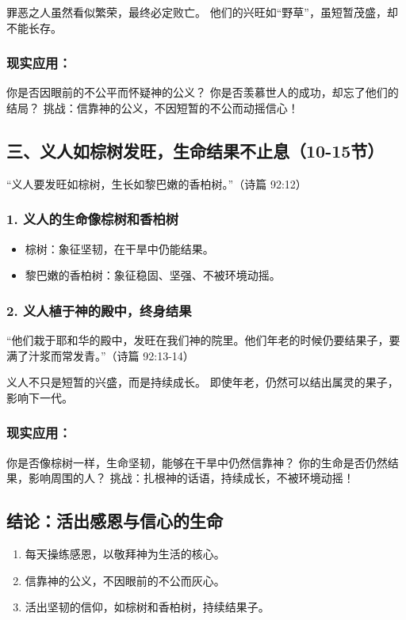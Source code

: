 \documentclass[a4paper, 12pt]{article}
\begin{document}
罪恶之人虽然看似繁荣，最终必定败亡。
他们的兴旺如“野草”，虽短暂茂盛，却不能长存。
\subsubsection*{现实应用：}

你是否因眼前的不公平而怀疑神的公义？
你是否羡慕世人的成功，却忘了他们的结局？
挑战：信靠神的公义，不因短暂的不公而动摇信心！

\subsection*{三、义人如棕树发旺，生命结果不止息（10-15节）}
“义人要发旺如棕树，生长如黎巴嫩的香柏树。”（诗篇 92:12）

\subsubsection*{1. 义人的生命像棕树和香柏树}
\begin{itemize}
    \item 棕树：象征坚韧，在干旱中仍能结果。

    \item 黎巴嫩的香柏树：象征稳固、坚强、不被环境动摇。

\end{itemize}
\subsubsection*{2. 义人植于神的殿中，终身结果}
“他们栽于耶和华的殿中，发旺在我们神的院里。他们年老的时候仍要结果子，要满了汁浆而常发青。”（诗篇 92:13-14）

义人不只是短暂的兴盛，而是持续成长。
即使年老，仍然可以结出属灵的果子，影响下一代。
\subsubsection*{现实应用：}

你是否像棕树一样，生命坚韧，能够在干旱中仍然信靠神？
你的生命是否仍然结果，影响周围的人？
挑战：扎根神的话语，持续成长，不被环境动摇！

\subsection*{结论：活出感恩与信心的生命}
\begin{enumerate}
    \item 每天操练感恩，以敬拜神为生活的核心。

    \item 信靠神的公义，不因眼前的不公而灰心。

    \item 活出坚韧的信仰，如棕树和香柏树，持续结果子。

\end{enumerate}
\end{document}
